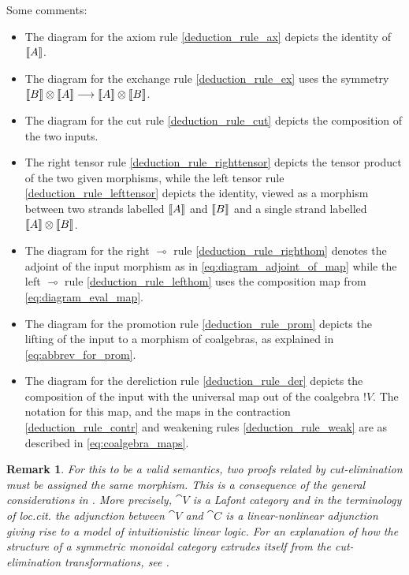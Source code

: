 \documentclass[english,letter paper,12pt,reqno]{article}
\theoremstyle{example}
\newtheorem{remark}[theorem]{Remark}
\begin{document}
Some comments:
\begin{itemize}
\item The diagram for the axiom rule \eqref{deduction_rule_ax} depicts the identity of $\llbracket A \rrbracket$.
\item The diagram for the exchange rule \eqref{deduction_rule_ex} uses the symmetry $\llbracket B \rrbracket \otimes \llbracket A \rrbracket \longrightarrow \llbracket A \rrbracket \otimes \llbracket B \rrbracket$.
\item The diagram for the cut rule \eqref{deduction_rule_cut} depicts the composition of the two inputs.
\item The right tensor rule \eqref{deduction_rule_righttensor} depicts the tensor product of the two given morphisms, while the left tensor rule \eqref{deduction_rule_lefttensor} depicts the identity, viewed as a morphism between two strands labelled $\llbracket A \rrbracket$ and $\llbracket B \rrbracket$ and a single strand labelled $\llbracket A \rrbracket \otimes \llbracket B \rrbracket$.
\item The diagram for the right $\multimap$ rule \eqref{deduction_rule_righthom} denotes the adjoint of the input morphism as in \eqref{eq:diagram_adjoint_of_map} while the left $\multimap$ rule \eqref{deduction_rule_lefthom} uses the composition map from \eqref{eq:diagram_eval_map}.
\item The diagram for the promotion rule \eqref{deduction_rule_prom} depicts the lifting of the input to a morphism of coalgebras, as explained in \eqref{eq:abbrev_for_prom}.
\item The diagram for the dereliction rule \eqref{deduction_rule_der} depicts the composition of the input with the universal map out of the coalgebra ${!} V$. The notation for this map, and the maps in the contraction \eqref{deduction_rule_contr} and weakening rules \eqref{deduction_rule_weak} are as described in \eqref{eq:coalgebra_maps}.
\end{itemize}

\begin{remark} For this to be a valid semantics, two proofs related by cut-elimination must be assigned the same morphism. This is a consequence of the general considerations in \cite[\S 7]{mellies}. More precisely, $\cat{V}$ is a Lafont category \cite[\S 7.2]{mellies} and in the terminology of \emph{loc.cit.} the adjunction between $\cat{V}$ and $\cat{C}$ is a linear-nonlinear adjunction giving rise to a model of intuitionistic linear logic. For an explanation of how the structure of a symmetric monoidal category extrudes itself from the cut-elimination transformations, see \cite[\S 2]{mellies}.
\end{remark}
\end{document}
